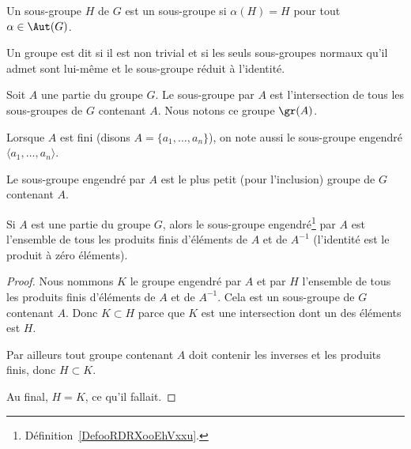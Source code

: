 \begin{definition}      \label{DEFooUXXTooCCLmQe}
    Un sous-groupe \( H\) de \( G\) est un sous-groupe  si \( \alpha(H)=H\) pour tout \( \alpha\in \Aut(G)\).
\end{definition}

\begin{definition}   \label{DefGroupeSimple}
    Un groupe est dit  si il est non trivial et si les seuls sous-groupes normaux qu'il admet sont lui-même et le sous-groupe réduit à l'identité.
\end{definition}

\begin{definition}        \label{DefooRDRXooEhVxxu}
    Soit \( A\) une partie du groupe \( G\). Le sous-groupe  par \( A\) est l'intersection de tous les sous-groupes de \( G\) contenant \( A\). Nous notons ce groupe \( \gr(A)\).

    Lorsque \( A \) est fini (disons \( A = \{a_1, \dots, a_n\} \)), on note aussi le sous-groupe engendré \( \langle a_1, \dots, a_n \rangle \).
\end{definition}

\begin{remark}
 Le sous-groupe engendré par \( A \) est le plus petit (pour l'inclusion) groupe de \( G\) contenant \( A\).
\end{remark}


\begin{lemma}   \label{LemFUIZooBZTCiy}
    Si \( A\) est une partie du groupe \( G\), alors le sous-groupe engendré\footnote{Définition~\ref{DefooRDRXooEhVxxu}.} par \( A\) est l'ensemble de tous les produits finis d'éléments de \( A\) et de \( A^{-1}\) (l'identité est le produit à zéro éléments).
\end{lemma}

\begin{proof}
    Nous nommons \( K\) le groupe engendré par \( A\) et par \( H\) l'ensemble de tous les produits finis d'éléments de \( A\) et de \( A^{-1}\). Cela est un sous-groupe de \( G\) contenant \( A\). Donc \( K\subset H\) parce que \( K\) est une intersection dont un des éléments est \( H\).

    Par ailleurs tout groupe contenant \( A\) doit contenir les inverses et les produits finis, donc \( H\subset K\).

    Au final, \( H=K\), ce qu'il fallait.
\end{proof}


